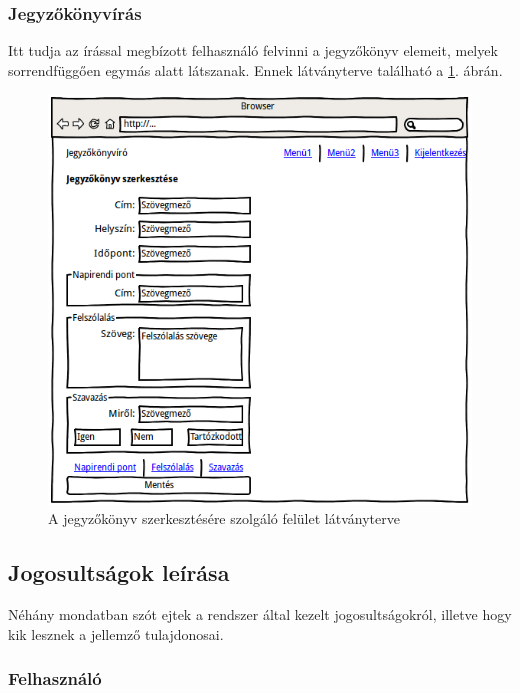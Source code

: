 \documentclass[a4paper,12pt,oneside]{report}
\begin{document}
\subsubsection{Jegyzőkönyvírás}

Itt tudja az írással megbízott felhasználó felvinni a jegyzőkönyv elemeit, melyek sorrendfüggően egymás alatt látszanak. Ennek látványterve található a \ref{fig:wireframe-jegyzokonyvszerkesztes}. ábrán.

\begin{figure}[h]
    \includegraphics[width=\textwidth]{wireframe-jegyzokonyvszerkesztes}
    \caption{A jegyzőkönyv szerkesztésére szolgáló felület látványterve}
    \label{fig:wireframe-jegyzokonyvszerkesztes}
\end{figure}

\subsection{Jogosultságok leírása}

Néhány mondatban szót ejtek a rendszer által kezelt jogosultságokról, illetve hogy kik lesznek a jellemző tulajdonosai.

\subsubsection*{Felhasználó}
\end{document}
